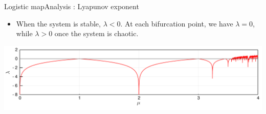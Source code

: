 \documentclass[usenames,dvipsnames,svgnames,10pt,aspectratio=169]{beamer}
\begin{document}
\begin{frame}[t, c]{Logistic map}{Analysis : Lyapunov exponent}

	\begin{itemize}
		\item When the system is stable, \( \lambda < 0 \). At each bifurcation point, we have \( \lambda = 0 \), while \( \lambda > 0 \) once the system is chaotic.
	\end{itemize}

	\medskip

	\centering
	\includegraphics[width=\textwidth]{lyapunov_exponents}

	\vspace{1cm}
\end{frame}
\end{document}

